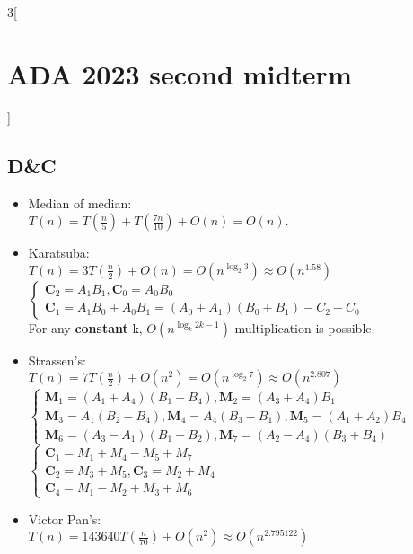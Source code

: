 \documentclass[10pt,a4paper]{report}
\begin{document}
\begin{multicols}{3}[\section*{ADA 2023 second midterm}]
\subsection*{D\&C}
  \begin{itemize} 
    \item Median of median: \\ $T(n) = T(\frac{n}{5}) + T(\frac{7n}{10}) + O(n) = O(n)$.
    \item Karatsuba: \\
          $T(n) = 3T(\frac{n}{2}) + O(n) = O(n^{\log_2 3}) \approx O(n^{1.58})$ \\
          $\begin{cases}
            \mathbf C_2 = A_1B_1, \mathbf C_0 = A_0B_0 \\
            \mathbf C_1 = A_1B_0 + A_0B_1 = (A_0 + A_1)(B_0 + B_1) - C_2 - C_0
          \end{cases}$ \\
          For any \textbf{constant} k, $O(n^{\log_k 2k-1})$ multiplication is possible.
    \item Strassen's: \\ $T(n) = 7T(\frac{n}{2}) + O(n^2) = O(n^{\log_2 7}) \approx O(n^{2.807})$ \\
          $\begin{cases}
            \mathbf M_1 = (A_1 + A_4)(B_1 + B_4), \mathbf M_2 = (A_3 + A_4)B_1 \\ 
            \mathbf M_3 = A_1(B_2 - B_4), \mathbf M_4 = A_4(B_3 - B_1), \mathbf M_5 = (A_1 + A_2)B_4 \\
            \mathbf M_6 = (A_3 - A_1)(B_1 + B_2), \mathbf M_7 = (A_2 - A_4)(B_3 + B_4)
          \end{cases}$
          $\begin{cases}
            \mathbf C_1 = M_1 + M_4 - M_5 + M_7 \\
            \mathbf C_2 = M_3 + M_5, \mathbf C_3 = M_2 + M_4 \\
            \mathbf C_4 = M_1 - M_2 + M_3 + M_6
          \end{cases}$ \\
    \item Victor Pan's: \\ $T(n) = ​143640T(\frac n {70}) + O(n^2) \approx O(n^{2.795122})$

\end{itemize}
\end{multicols}
\end{document}
